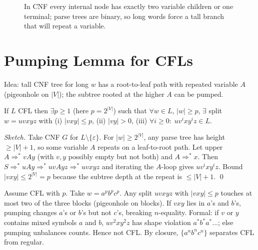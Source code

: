 \begin{figure}[h]
\centering
{}
\caption{In CNF every internal node has exactly two variable children or one terminal; parse trees are binary, so long words force a tall branch that will repeat a variable.}
\label{fig:cnf-binary}
\end{figure}

\section{Pumping Lemma for CFLs}
\label{sec:pumping-cfl}
Idea: tall CNF tree for long $w$ has a root-to-leaf path with repeated variable $A$ (pigeonhole on $|V|$); the subtree rooted at the higher $A$ can be pumped.

\begin{theorem}
If $L$ CFL then $\exists p\ge1$ (here $p=2^{|V|}$) such that $\forall w\in L$, $|w|\ge p$, $\exists$ split $w=uvxyz$ with (i) $|vxy|\le p$, (ii) $|vy|>0$, (iii) $\forall i\ge0:\;uv^ixy^iz\in L$.
\end{theorem}
\begin{proof}[Sketch]
Take CNF $G$ for $L\setminus\{\varepsilon\}$. For $|w|\ge2^{|V|}$, any parse tree has height $\ge|V|+1$, so some variable $A$ repeats on a leaf-to-root path. Let upper $A\Rightarrow^*vAy$ (with $v,y$ possibly empty but not both) and $A\Rightarrow^*x$. Then $S\Rightarrow^*uAy\Rightarrow^*uvA y z\Rightarrow^*uvxyz$ and iterating the $A$-loop gives $uv^ixy^iz$. Bound $|vxy|\le2^{|V|}=p$ because the subtree depth at the repeat is $\le|V|+1$. \qed
\end{proof}

\begin{example}
Assume CFL with $p$. Take $w=a^pb^pc^p$. Any split $uvxyz$ with $|vxy|\le p$ touches at most two of the three blocks (pigeonhole on blocks). If $vxy$ lies in $a$'s and $b$'s, pumping changes $a$'s or $b$'s but not $c$'s, breaking $n$-equality. Formal: if $v$ or $y$ contains mixed symbols $a$ and $b$, $uv^2xy^2z$ has shape violation $a^*b^*a^*...$; else pumping unbalances counts. Hence not CFL. By closure, $\{a^nb^nc^n\}$ separates CFL from regular.
\end{example}

